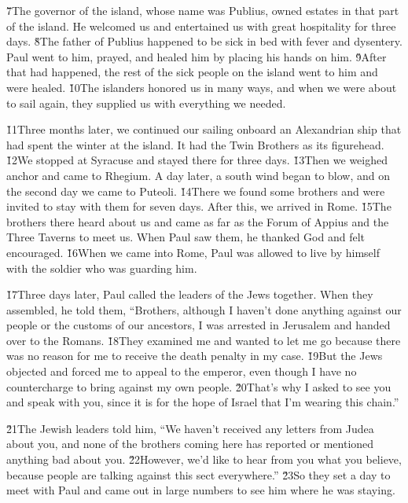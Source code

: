 \v{7}The governor of the island, whose name was Publius, owned estates in that part of the island. He welcomed us and entertained us with great hospitality for three days. \v{8}The father of Publius happened to be sick in bed with fever and dysentery. Paul went to him, prayed, and healed him by placing his hands on him. \v{9}After that had happened, the rest of the sick people on the island went to him and were healed. \v{10}The islanders honored us in many ways, and when we were about to sail again, they supplied us with everything we needed.

\v{11}Three months later, we continued our sailing onboard an Alexandrian ship that had spent the winter at the island. It had the Twin Brothers as its figurehead. \v{12}We stopped at Syracuse and stayed there for three days. \v{13}Then we weighed anchor and came to Rhegium. A day later, a south wind began to blow, and on the second day we came to Puteoli. \v{14}There we found some brothers and were invited to stay with them for seven days. After this, we arrived in Rome. \v{15}The brothers there heard about us and came as far as the Forum of Appius and the Three Taverns to meet us. When Paul saw them, he thanked God and felt encouraged. \v{16}When we came into Rome, Paul was allowed to live by himself with the soldier who was guarding him.

\v{17}Three days later, Paul called the leaders of the Jews together. When they assembled, he told them, ``Brothers, although I haven't done anything against our people or the customs of our ancestors, I was arrested in Jerusalem and handed over to the Romans. \v{18}They examined me and wanted to let me go because there was no reason for me to receive the death penalty in my case. \v{19}But the Jews objected and forced me to appeal to the emperor, even though I have no countercharge to bring against my own people. \v{20}That's why I asked to see you and speak with you, since it is for the hope of Israel that I'm wearing this chain.''

\v{21}The Jewish leaders told him, ``We haven't received any letters from Judea about you, and none of the brothers coming here has reported or mentioned anything bad about you. \v{22}However, we'd like to hear from you what you believe, because people are talking against this sect everywhere.'' \v{23}So they set a day to meet with Paul and came out in large numbers to see him where he was staying.

